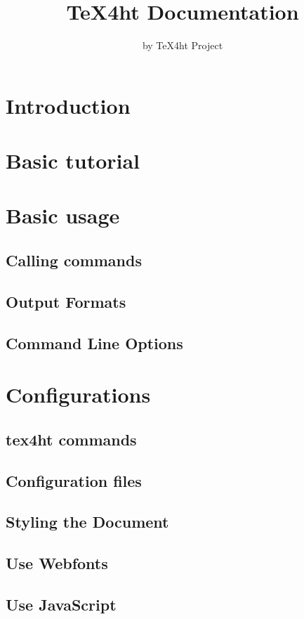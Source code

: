 \documentclass{book}
\title{TeX4ht Documentation}
\author{by TeX4ht Project}
\begin{document}
\maketitle

\tableofcontents

\chapter{Introduction}

\chapter{Basic tutorial}
\chapter{Basic usage}
\section{Calling commands}
\section{Output Formats}
\section{Command Line Options}


\chapter{Configurations}
\section{tex4ht commands}

\section{Configuration files}
\section{Styling the Document}
\section{Use Webfonts}
\section{Use JavaScript}
\end{document}
